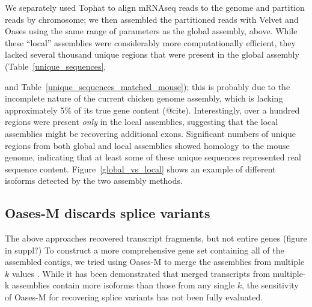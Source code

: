 \documentclass[10pt]{article}
\begin{document}
We separately used Tophat to align mRNAseq reads to the genome and partition
reads by chromosome; we then assembled the partitioned reads with
Velvet and Oases using the same range of parameters as the global
assembly, above.  While these ``local'' assemblies were considerably more
computationally efficient, they lacked several thousand unique regions
that were present in the global assembly (Table~\ref{unique_sequences},

and Table~\ref{unique_sequences_matched_mouse}); this is probably due to the
incomplete nature of the current chicken genome assembly, which is lacking
approximately 5\% of its true gene content (@cite).  Interestingly, over a
hundred regions were present {\em only} in the local assemblies,
suggesting that the local assemblies might be recovering additional exons.
Significant numbers of unique regions from both global and local assemblies
showed homology to the mouse genome, indicating that at least some of these
unique sequences represented real sequence content.
Figure~\ref{global_vs_local} shows an example of different isoforms detected by
the two assembly methods.




\subsection*{Oases-M discards splice variants}

The above approaches recovered transcript fragments, but not entire genes
(figure in suppl?)
To construct a more comprehensive gene set containing all of the
assembled contigs, we tried using Oases-M to merge the assemblies from
multiple $k$ values \cite{Schulz:2012je}.  While it has been
demonstrated that merged transcripts from multiple-k assemblies
contain more isoforms than those from any single $k$, the sensitivity
of Oases-M for recovering splice variants has not been fully
evaluated.
\end{document}
